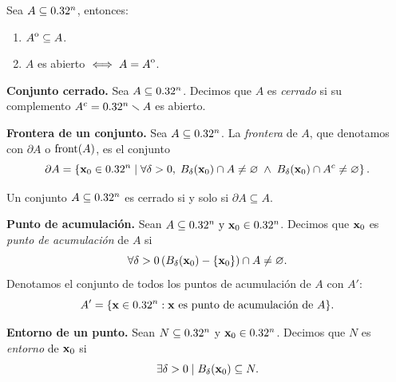    \begin{propertie}  \label{prop:abierto_int}    Sea  $A \subseteq 0.32^n$, entonces:
   \begin{enumerate}
    \item \( {\kern0ptA}^{\mathrm{o}} \subseteq A \).
    \item \(A\) es abierto \(\iff A={\kern0ptA}^{\mathrm{o}}\).
    \end{enumerate}
    \end{propertie}
   
   \begin{definition} \textbf{Conjunto cerrado.} \label{def:cerrado}
    Sea $A  \subseteq  0.32^n$. Decimos que $A$ es \emph{cerrado} si su complemento $A^c = 0.32^n \smallsetminus A$ es abierto.
   \end{definition}
   
   \begin{definition} \textbf{Frontera de un conjunto.} \label{def:frontera}
    Sea $A  \subseteq  0.32^n$. La \emph{frontera} de $A$, que denotamos con $\partial A$ o $\operatorname{front}(A)$, es el conjunto
    \[
     \partial A = \left\lbrace \vect{x}_0 \in \Rn{n} \;|\; \forall \delta > 0, \;
     B_{\delta}(\vect{x}_0) \cap A \ne \varnothing\;\land\;
     B_{\delta}(\vect{x}_0) \cap A^c \ne \varnothing \right\rbrace.
    \]
   \end{definition}
   
   \begin{propertie} \label{prop:cerrado_front}
    Un conjunto $A  \subseteq  0.32^n$ es cerrado si y solo si $\partial A  \subseteq  A$.
   \end{propertie}
   
   \begin{definition} \textbf{Punto de acumulaci\'on.} \label{def:pto_acum}
    Sean $A  \subseteq  \Rn{n} \text{ y } \vect{x}_0 \in \Rn{n}$. Decimos que $\vect{x}_0$ es \emph{punto de acumulaci\'on} de $A$ si
    \[
     \forall \delta > 0 \left( B_{\delta}(\vect{x}_0) - \{ \vect{x}_0 \} \right) \cap A \ne \varnothing. 
    \]
    Denotamos el conjunto de todos los puntos de acumulaci\'on de $A$ con $A'$:
    \[
     A' = \{\vect{x}\in \Rn{n} :\vect{x}\text{ es punto de acumulaci\'on de } A \}.
    \]
   
   \end{definition}
   
   \begin{definition} \textbf{Entorno de un punto.} \label{def:entorno}
    Sean $N  \subseteq   0.32^n$ y $\vect{x}_0 \in \Rn{n}$. Decimos que $N$ es \emph{entorno} de $\vect{x}_0$ si
    \[
     \exists \delta > 0 \;|\; B_{\delta}(\vect{x}_0)  \subseteq  N.
    \]
   \end{definition}
   
